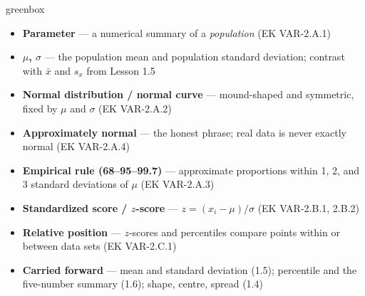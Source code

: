 \documentclass[10pt]{article}
\begin{document}
\boxguard
\begin{skillbox}{greenbox}
\begin{minipage}[t]{0.48\linewidth}
    \begin{itemize}
        \item \textbf{Parameter} --- a numerical summary of a \emph{population} (EK VAR-2.A.1)
        \item \textbf{$\mu$, $\sigma$} --- the population mean and population standard
              deviation; contrast with $\bar x$ and $s_x$ from Lesson 1.5
        \item \textbf{Normal distribution / normal curve} --- mound-shaped and symmetric, fixed
              by $\mu$ and $\sigma$ (EK VAR-2.A.2)
        \item \textbf{Approximately normal} --- the honest phrase; real data is never exactly
              normal (EK VAR-2.A.4)
    \end{itemize}
\end{minipage}
\hfill
\begin{minipage}[t]{0.48\linewidth}
    \begin{itemize}
        \item \textbf{Empirical rule (68--95--99.7)} --- approximate proportions within 1, 2, and
              3 standard deviations of $\mu$ (EK VAR-2.A.3)
        \item \textbf{Standardized score / $z$-score} --- $z = (x_i - \mu)/\sigma$
              (EK VAR-2.B.1, 2.B.2)
        \item \textbf{Relative position} --- $z$-scores and percentiles compare points within or
              between data sets (EK VAR-2.C.1)
        \item \textbf{Carried forward} --- mean and standard deviation (1.5); percentile and the
              five-number summary (1.6); shape, centre, spread (1.4)
    \end{itemize}
\end{minipage}
\end{skillbox}
\end{document}
